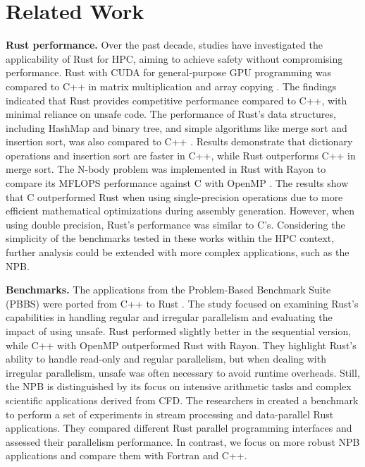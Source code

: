 
\section{Related Work}\label{sec:rw}
\textbf{Rust performance.} Over the past decade, studies have investigated the applicability of Rust for HPC, aiming to achieve safety without compromising performance. Rust with CUDA for general-purpose GPU programming was compared to C++ in matrix multiplication and array copying \cite{rw_tes}. The findings indicated that Rust provides competitive performance compared to C++, with minimal reliance on unsafe code. The performance of Rust's data structures, including HashMap and binary tree, and simple algorithms like merge sort and insertion sort, was also compared to C++ \cite{rw_isfast}. Results demonstrate that dictionary operations and insertion sort are faster in C++, while Rust outperforms C++ in merge sort. The N-body problem was implemented in Rust with Rayon to compare its MFLOPS performance against C with OpenMP \cite{rw_pervsprog}. The results show that C outperformed Rust when using single-precision operations due to more efficient mathematical optimizations during assembly generation. However, when using double precision, Rust's performance was similar to C's. Considering the simplicity of the benchmarks tested in these works within the HPC context, further analysis could be extended with more complex applications, such as the NPB.

\textbf{Benchmarks.} The applications from the Problem-Based Benchmark Suite (PBBS) \cite{pbbs_c} were ported from C++ to Rust \cite{rw_zerocost}. The study focused on examining Rust's capabilities in handling regular and irregular parallelism and evaluating the impact of using unsafe. Rust performed slightly better in the sequential version, while C++ with OpenMP outperformed Rust with Rayon. They highlight Rust's ability to handle read-only and regular parallelism, but when dealing with irregular parallelism, unsafe was often necessary to avoid runtime overheads. Still, the NPB is distinguished by its focus on intensive arithmetic tasks and complex scientific applications derived from CFD. The researchers in \cite{PIEPER:COLA:21} created a benchmark to perform a set of experiments in stream processing and data-parallel Rust applications. They compared different Rust parallel programming interfaces and assessed their parallelism performance. In contrast, we focus on more robust NPB applications and compare them with Fortran and C++.

